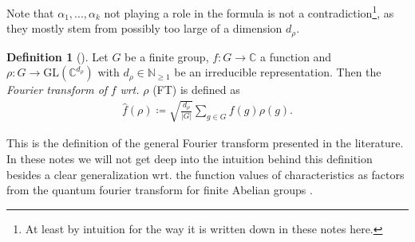 \documentclass[10pt]{amsart}
\theoremstyle{definition}
\newtheorem{definition}{Definition}
\theoremstyle{remark}
\begin{document}
    Note that \(\alpha_1, ..., \alpha_k\) not playing a role in the formula is not a contradiction\footnote{At least by intuition for the way it is written down in these notes here.}, as they mostly stem from possibly too large of a dimension \(d_\rho\). %

    \begin{definition}[{\cite[p. 27]{Lomont2004}}]
        Let \(G\) be a finite group, \(f\colon G \to \mathbb{C}\) a function and \(\rho\colon G \to \text{GL}(\mathbb{C}^{d_\rho})\) with \(d_\rho \in \mathbb{N}_{\geq 1}\) be an irreducible representation. Then the \emph{Fourier transform of} \(f\) \emph{wrt.} \(\rho\) (FT) is defined as
        \begin{align}
            \hat{f}(\rho) \coloneqq \sqrt{\frac{d_\rho}{|G|}} \sum_{g \in G} f(g)\rho(g).
        \end{align}
    \end{definition}

    This is the definition of the general Fourier transform presented in the literature. In these notes we will not get deep into the intuition behind this definition besides a clear generalization wrt. the function values of characteristics as factors from the quantum fourier transform for finite Abelian groups \cite[p. 20]{Lomont2004}.

    \phantom{}
    
\end{document}
